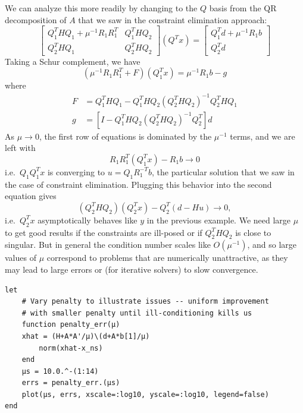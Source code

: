 \documentclass[12pt, leqno]{article} %
\begin{document}
We can analyze this more readily by changing to the \(Q\) basis from the
QR decomposition of \(A\) that we saw in the constraint elimination
approach: \[\begin{bmatrix}
  Q_1^T H Q_1 + \mu^{-1} R_1 R_1^T & Q_1^T H Q_2 \\
  Q_2^T H Q_1 & Q_2^T H Q_2
\end{bmatrix}
(Q^T x) =
\begin{bmatrix}
  Q_1^T d + \mu^{-1} R_1 b \\
  Q_2^T d
\end{bmatrix}\] Taking a Schur complement, we have
\[(\mu^{-1} R_1 R_1^T + F)(Q_1^T x) = \mu^{-1} R_1 b - g\] where
\begin{align*}
  F &= Q_1^T H Q_1 - Q_1^T H Q_2 (Q_2^T H Q_2)^{-1} Q_2^T H Q_1 \\
  g &= [I - Q_1^T H Q_2 (Q_2^T H Q_2)^{-1} Q_2^T] d
\end{align*} As \(\mu \rightarrow 0\), the first row of equations is
dominated by the \(\mu^{-1}\) terms, and we are left with
\[R_1 R_1^T (Q_1^T x) - R_1 b \rightarrow 0\] i.e.~\(Q_1 Q_1^T x\) is
converging to \(u = Q_1 R_1^{-T} b\), the particular solution that we
saw in the case of constraint elimination. Plugging this behavior into
the second equation gives
\[(Q_2^T H Q_2) (Q_2^T x) - Q_2^T (d-Hu) \rightarrow 0,\]
i.e.~\(Q_2^T x\) asymptotically behaves like \(y\) in the previous
example. We need large \(\mu\) to get good results if the constraints
are ill-posed or if \(Q_2^T H Q_2\) is close to singular. But in general
the condition number scales like \(O(\mu^{-1})\), and so large values of
\(\mu\) correspond to problems that are numerically unattractive, as
they may lead to large errors or (for iterative solvers) to slow
convergence.

\begin{verbatim}
let
    # Vary penalty to illustrate issues -- uniform improvement
    # with smaller penalty until ill-conditioning kills us
    function penalty_err(μ)
	xhat = (H+A*A'/μ)\(d+A*b[1]/μ)
        norm(xhat-x_ns)
    end
    μs = 10.0.^-(1:14)
    errs = penalty_err.(μs)
    plot(μs, errs, xscale=:log10, yscale=:log10, legend=false)
end
\end{verbatim}
\end{document}
